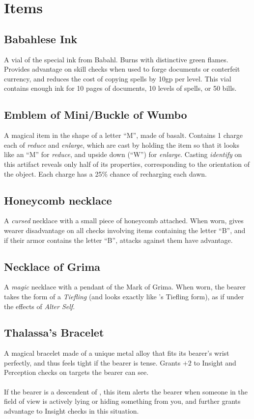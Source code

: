 \section{Items}
\subsection{Babahlese Ink}
\label{items:ink}
A vial of the special ink from Babahl. Burns with distinctive green flames. Provides advantage on skill checks when used to forge documents or conterfeit currency, and reduces the cost of copying spells by 10gp per level. This vial contains enough ink for 10 pages of documents, 10 levels of spells, or 50 bills.

\subsection{Emblem of Mini/Buckle of Wumbo}
\label{items:wumbo}
A magical item in the shape of a letter ``M'', made of basalt. Contains 1 charge each of \textit{reduce} and \textit{enlarge}, which are cast by holding the item so that it looks like an ``M'' for \textit{reduce}, and upside down (``W'') for \textit{enlarge}. Casting \textit{identify} on this artifact reveals only half of its properties, corresponding to the orientation of the object. Each charge has a 25\% chance of recharging each dawn.

\subsection{Honeycomb necklace}
\label{items:honeycomb}
A \textit{cursed} necklace with a small piece of honeycomb attached. When worn, gives wearer disadvantage on all checks involving items containing the letter ``B'', and if their armor contains the letter ``B'', attacks against them have advantage. 

\subsection{Necklace of Grima}
\label{items:grimanecklace}
A \textit{magic} necklace with a pendant of the Mark of Grima. When worn, the bearer takes the form of a \textit{Tiefling} (and looks exactly like 's Tiefling form), as if under the effects of \textit{Alter Self}.


\subsection{Thalassa's Bracelet}
\label{items:bracelet}
A magical bracelet made of a unique metal alloy that fits its bearer's wrist perfectly, and thus feels tight if the bearer is tense. Grants $+2$ to Insight and Perception checks on targets the bearer can see.\\
\\
If the bearer is a descendent of , this item alerts the bearer when someone in the field of view is actively lying or hiding something from you, and further grants advantage to Insight checks in this situation.

